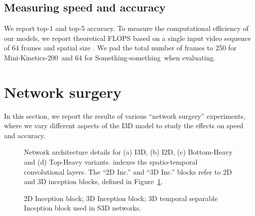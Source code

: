 \documentclass[runningheads]{llncs}
\newcommand{\MK}{Mini-Kinetics-200}
\newcommand{\Something}{Something-something}
\begin{document}
\subsection{Measuring speed and accuracy}

We report top-1 and top-5 accuracy. To measure the computational efficiency of our models, we report theoretical FLOPS based on a single input video sequence of 64 frames and spatial size . We pad the total number of frames to 250 for \MK\ and 64 for \Something\ when evaluating. \section{Network surgery}
\label{sec:surgery}

In this section, we report the results of various ``network surgery'' experiments, where we vary different aspects of the I3D model to study the effects on speed and accuracy.

\begin{figure}[!htp]
\begin{center}
\end{center}
\caption{
Network architecture details for (a) I3D, (b) I2D, (c) Bottom-Heavy and (d) Top-Heavy variants.  indexes the spatio-temporal convolutional layers. The ``2D Inc.'' and ``3D Inc.'' blocks
refer to 2D and 3D inception blocks, defined in Figure~\ref{fig:inc_blocks}.}
\end{figure}

\begin{figure}
\begin{center}
\qquad
{}\qquad
{}
\end{center}
\caption{ 2D Inception block;
 3D Inception block;
 3D temporal separable Inception block used in S3D networks.
}
\label{fig:inc_blocks}
\end{figure}
\end{document}
